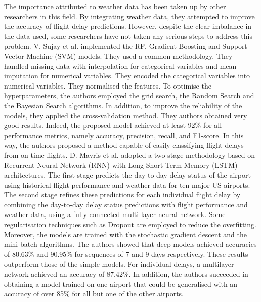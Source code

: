 \documentclass[12pt,oneside]{book} %
\begin{document}
\noindent The importance attributed to weather data has been taken up by other researchers in this field. By integrating weather data, they attempted to improve the accuracy of flight delay predictions. However, despite the clear imbalance in the data used, some researchers have not taken any serious steps to address this problem. V. Sujay et al. \cite{Sujay} implemented the RF, Gradient Boosting and Support Vector Machine (SVM) models. They used a common methodology. They handled missing data with interpolation for categorical variables and mean imputation for numerical variables. They encoded the categorical variables into numerical variables. They normalised the features. To optimise the hyperparameters, the authors employed the grid search, the Random Search and the Bayesian Search algorithms. In addition, to improve the reliability of the models, they applied the cross-validation method. They authors obtained very good results. Indeed, the proposed model achieved at least 92\% for all performance metrics, namely accuracy, precision, recall, and F1-score. In this way, the authors proposed a method capable of easily classifying flight delays from on-time flights. D. Mavris et al. \cite{Mavris} adopted a two-stage methodology based on Recurrent Neural Network (RNN) with Long Short-Term Memory (LSTM) architectures. The first stage predicts the day-to-day delay status of the airport using historical flight performance and weather data for ten major US airports. The second stage refines these predictions for each individual flight delay by combining the day-to-day delay status predictions with flight performance and weather data, using a fully connected multi-layer neural network. Some regularisation techniques such as Dropout are employed to reduce the overfitting. Moreover, the models are trained with the stochastic gradient descent and the mini-batch algorithms. The authors showed that deep models achieved accuracies of 80.63\% and 90.95\% for sequences of 7 and 9 days respectively. These results outperform those of the simple models. For individual delays, a multilayer network achieved an accuracy of 87.42\%. In addition, the authors succeeded in obtaining a model trained on one airport that could be generalised with an accuracy of over 85\% for all but one of the other airports.
\end{document}
